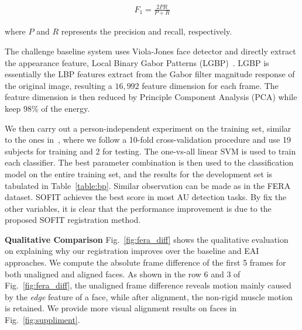 \documentclass[10pt,journal]{IEEEtran}
\begin{document}
\begin{align}
F_1 = \frac{2PR}{P+R}
\end{align}

\noindent where $P$ and $R$ represents the precision and recall, respectively.

The challenge baseline system uses Viola-Jones face detector and directly extract the appearance feature, Local Binary Gabor Patterns (LGBP)~\cite{LGBP}. LGBP is essentially the LBP features extract from the Gabor filter magnitude response of the original image, resulting a $16,992$ feature dimension for each frame. The feature dimension is then reduced by Principle Component Analysis (PCA) while keep 98\% of the energy. 

We then carry out a person-independent experiment on the training set, similar to the ones in~\cite{BP4D,FERA15}, where we follow a 10-fold cross-validation procedure and use 19 subjects for training and 2 for testing. The one-vs-all linear SVM is used to train each classifier. The best parameter combination is then used to the classification model on the entire training set, and the results for the development set is tabulated in Table~\ref{table:bp}. Similar observation can be made as in the FERA dataset. SOFIT achieves the best score in most AU detection tasks. By fix the other variables, it is clear that the performance improvement is due to the proposed SOFIT registration method.




\noindent \textbf{Qualitative Comparison}
Fig.~\ref{fig:fera_diff} shows the qualitative evaluation on explaining why our registration improves over the baseline and EAI approaches. We compute the absolute frame difference of the first 5 frames for both unaligned and aligned faces. As shown in the row 6 and 3 of Fig.~\ref{fig:fera_diff}, the unaligned frame difference reveals motion mainly caused by the \textit{edge} feature of a face, while after alignment, the non-rigid muscle motion is retained. We provide more visual alignment results on faces in Fig.~\ref{fig:suppliment}.
\end{document}

